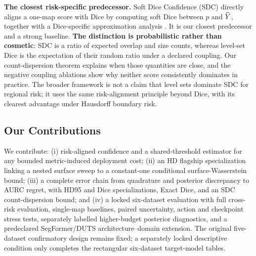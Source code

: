 \noindent\textbf{The closest risk-specific predecessor.}
Soft Dice Confidence (SDC) directly aligns a one-map score with Dice by computing
soft Dice between \(p\) and \(\widehat{Y}\), together with a Dice-specific
approximation analysis \citep{sdc}. It is our closest predecessor and a strong
baseline. \textbf{The distinction is probabilistic rather than cosmetic}: SDC is a ratio
of expected overlap and size counts, whereas level-set Dice is the expectation
of their random ratio under a declared coupling. Our count-dispersion theorem
explains when those quantities are close, and the negative coupling ablations
show why neither score consistently dominates in practice. The broader framework is not a
claim that level sets dominate SDC for regional risk; it uses the same
risk-alignment principle beyond Dice, with its clearest advantage under Hausdorff
boundary risk.

\subsection{Our Contributions}

We contribute: (i) risk-aligned confidence and a shared-threshold estimator for
any bounded metric-induced deployment cost; (ii) an HD flagship specialization linking
a nested surface sweep to a constant-one conditional surface-Wasserstein bound; (iii) a
complete error chain from quadrature and posterior discrepancy to AURC regret,
with HD95 and Dice specializations, Exact Dice, and an SDC count-dispersion
bound; and (iv) a locked six-dataset evaluation with full cross-risk evaluation,
single-map baselines, paired uncertainty, action and checkpoint stress tests,
separately labelled higher-budget posterior diagnostics, and a predeclared
SegFormer/DUTS architecture--domain extension. The original five-dataset
confirmatory design remains fixed; a separately locked descriptive condition
only completes the rectangular six-dataset target-model tables.
